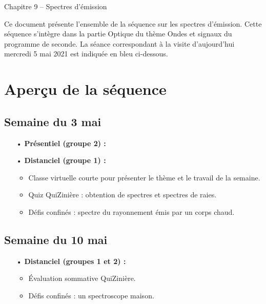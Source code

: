 \documentclass[12pt,a4paper,fleqn]{article}
\begin{document}
\begin{header}
Chapitre 9 -- Spectres d'émission
\end{header}

Ce document présente l'ensemble de la séquence sur les spectres d'émission.
Cette séquence s'intègre dans la partie \og Optique \fg{} du thème \og Ondes et signaux \fg{} du programme de seconde.
La séance correspondant à la visite d'aujourd'hui mercredi 5 mai 2021 est indiquée en \textcolor{bleu_f}{bleu} ci-dessous.

\section*{Aperçu de la séquence}

\subsection*{Semaine du 3 mai}

\begin{itemize}
\item[•] \textbf{Présentiel (groupe 2) :}
\item[•] \textbf{Distanciel (groupe 1) :}
\begin{itemize}
\item Classe virtuelle courte pour présenter le thème et le travail de la semaine.
\item Quiz QuiZinière : obtention de spectres et spectres de raies.
\item Défis confinés : spectre du rayonnement émis par un corps chaud.
\end{itemize}
\end{itemize}

\subsection*{Semaine du 10 mai}
\begin{itemize}
\item[•] \textbf{Distanciel (groupes 1 et 2) :}
\begin{itemize}
\item Évaluation sommative QuiZinière.
\item Défis confinés : un spectroscope maison.
\end{itemize}
\end{itemize}
\end{document}
